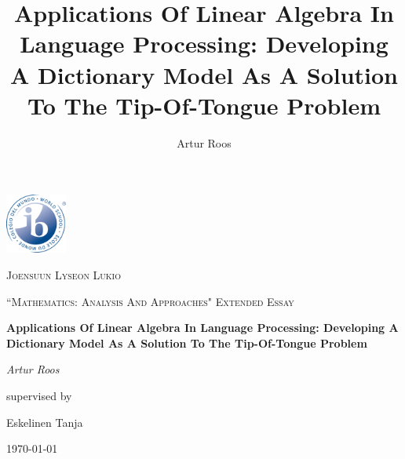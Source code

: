 \documentclass{article}
\title{\textbf{Applications Of Linear Algebra In Language Processing: Developing A Dictionary Model As A Solution To The Tip-Of-Tongue Problem}}
\author{Artur Roos}
\begin{document}
\begin{titlepage}
	\centering
	\includegraphics[width=0.15\textwidth]{dp-programme-logo}\par\vspace{1cm}
	{\textsc{Joensuun Lyseon Lukio} \par}
	\vspace{1cm}
	{\Large \textsc{``Mathematics: Analysis And Approaches" Extended Essay}\par}
	\vspace{1.5cm}
	{\huge\bfseries Applications Of Linear Algebra In Language Processing: Developing A Dictionary Model As A Solution To The Tip-Of-Tongue Problem\par}
	\vspace{2cm}
	{\Large\itshape Artur Roos\par}
	\vfill
	supervised by\par
	Eskelinen Tanja
	\vfill
	{\large \today\par}
\end{titlepage}

\clearpage
{}
\tableofcontents
\vspace{48pt}
\end{document}
